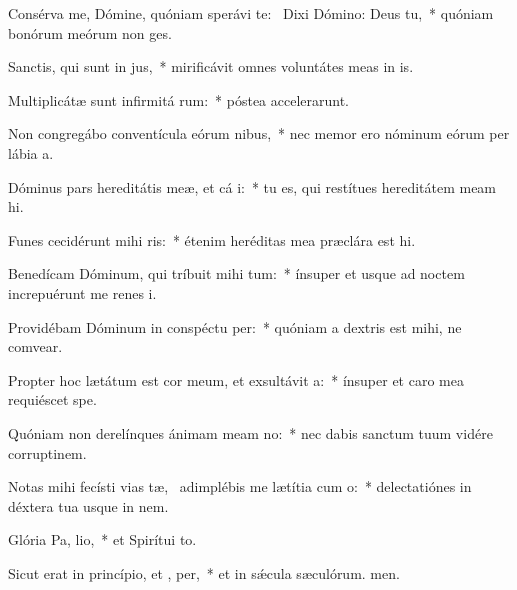\item Consérva me, Dómine, quóniam sperávi  te:~\pscross{} Dixi Dómino: Deus   tu,~* quóniam bonórum meórum non ges.
\item Sanctis, qui sunt in  jus,~* mirificávit omnes voluntátes meas in is.
\item Multiplicátæ sunt infirmitá rum:~* póstea accelerarunt.
\item Non congregábo conventícula eórum  nibus,~* nec memor ero nóminum eórum per lábia a.
\item Dóminus pars hereditátis meæ, et cá i:~* tu es, qui restítues hereditátem meam hi.
\item Funes cecidérunt mihi  ris:~* étenim heréditas mea præclára est hi.
\item Benedícam Dóminum, qui tríbuit mihi tum:~* ínsuper et usque ad noctem increpuérunt me renes i.
\item Providébam Dóminum in conspéctu  per:~* quóniam a dextris est mihi, ne comvear.
\item Propter hoc lætátum est cor meum, et exsultávit  a:~* ínsuper et caro mea requiéscet  spe.
\item Quóniam non derelínques ánimam meam  no:~* nec dabis sanctum tuum vidére corruptinem.
\item Notas mihi fecísti vias tæ,~\pscross{} adimplébis me lætítia cum  o:~* delectatiónes in déxtera tua usque in nem.
\item Glória Pa,  lio,~* et Spirítui to.
\item Sicut erat in princípio, et ,  per,~* et in sǽcula sæculórum. men.
